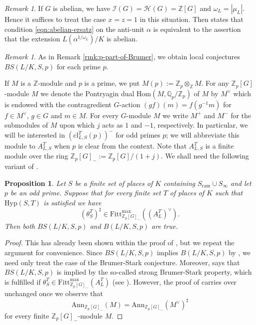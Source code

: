 \documentclass[12pt]{amsart}
\theoremstyle{plain}
\newtheorem{prop}[theorem]{Proposition}
\theoremstyle{remark}
\newtheorem{remark}[theorem]{Remark}
\theoremstyle{definition}
\numberwithin{equation}{section}
\begin{document}
{\begin{remark}
If $G$ is abelian, we have $\mathcal{I}(G) = \mathcal{H}(G) = {\mathbb{Z}}[G]$ and $\omega_{L} = |\mu_{L}|$.
Hence it suffices to treat the case $x=z=1$ in this situation.
Then \cite[Proposition 1.2, p.~83]{MR782485} states that condition \eqref{eqn:abelian-ersatz}
on the anti-unit $\alpha$ is equivalent to the assertion that the extension $L(\alpha^{1/\omega_{L}}) / K$ is abelian.
\end{remark}

\begin{remark}
As in Remark \ref{rmk:p-part-of-Brumer}, we obtain local conjectures $BS(L/K,S,p)$ for each prime $p$.
\end{remark}

If $M$ is a ${\mathbb{Z}}$-module and $p$ is a prime, we put $M(p) := {\mathbb{Z}}_{p} \otimes_{\mathbb{Z}} M$.
For any ${\mathbb{Z}}_{p}[G]$-module $M$ we denote the Pontryagin dual ${\mathrm{Hom}} (M, {\mathbb{Q}}_{p} / {\mathbb{Z}}_{p})$ of $M$ by $M^{\vee}$ which
is endowed with the contragredient $G$-action $(gf)(m) = f (g^{-1} m)$ for $f \in M^{\vee}$, $g \in G$ and $m \in M$.
For every $G$-module $M$
we write $M^{+}$ and $M^{-}$ for the submodules of $M$ upon which $j$ acts as $1$ and $-1$, respectively.
In particular, we will be interested in $({\mathrm{cl}}_{L,S}^{T}(p))^-$ for odd primes $p$; we will abbreviate this module
to $A_{L,S}^{T}$ when $p$ is clear from the context. Note that $A_{L,S}^{T}$ is a finite module
over the ring ${\mathbb{Z}}_{p}[G]_{-} := {\mathbb{Z}}_{p}[G]/(1+j)$.
We shall need the following variant of \cite[Proposition 3.9]{MR2976321}.

\begin{prop} \label{prop:SBS_implies_BS}
Let $S$ be a finite set of places of $K$ containing $S_{\mathrm{ram}} \cup S_{\infty}$ and let $p$ be an odd prime.
Suppose that for every finite set $T$ of places of $K$ such that ${\mathrm{Hyp}}(S,T)$ is satisfied we have
\[
(\theta_S^T)^{\sharp} \in {\mathrm{Fitt}}^{\max}_{{\mathbb{Z}}_{p}[G]_{-}}((A_{L}^{T})^{\vee}).
\]
Then both $BS(L/K,S,p)$ and $B(L/K,S,p)$ are true.
\end{prop}

\begin{proof}
This has already been shown within the proof of \cite[Corollary 4.6]{MR3072281}, but we repeat the argument for convenience.
Since $BS(L/K,S,p)$ implies $B(L/K,S,p)$ by \cite[Lemma 2.12]{MR2976321}, we need only treat the case of the Brumer-Stark conjecture.
Moreover, \cite[Proposition 3.9]{MR2976321} says that $BS(L/K,S,p)$ is implied by the so-called strong Brumer-Stark property, 
which is fulfilled if $\theta_{S}^{T} \in {\mathrm{Fitt}}_{{\mathbb{Z}}_{p}[G]_{-}}^{\max}(A_{L}^{T})$ (see \cite[Definition 3.6]{MR2976321}).
However, the proof of \cite[Proposition 3.9]{MR2976321} carries over unchanged once we observe that
\[
{\mathrm{Ann}}_{{\mathbb{Z}}_{p}[G]_{-}}(M) = {\mathrm{Ann}}_{{\mathbb{Z}}_{p}[G]_{-}}(M^{\vee})^{\sharp}
\]
for every finite ${\mathbb{Z}}_{p}[G]_{-}$-module $M$.
\end{proof}

}
\end{document}
